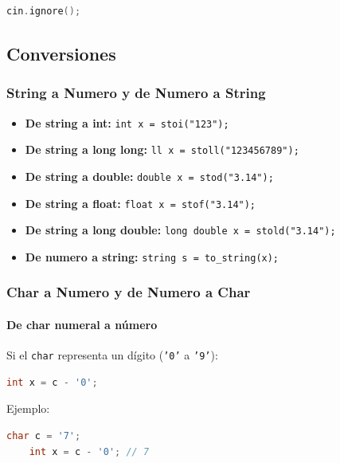 \begin{lstlisting}[language=C++]
	cin.ignore();
\end{lstlisting}



\subsection{Conversiones }

\subsubsection{String a Numero y de Numero a String }

\begin{itemize}
	\item \textbf{De string a int:}
	\texttt{int x = stoi("123");}

	\item \textbf{De string a long long:}
	\texttt{ll x = stoll("123456789");}

	\item \textbf{De string a double:}
	\texttt{double x = stod("3.14");}

	\item \textbf{De string a float:}
	\texttt{float x = stof("3.14");}

	\item \textbf{De string a long double:}
	\texttt{long double x = stold("3.14");}

	\item \textbf{De numero a string:}
	\texttt{string s = to\_string(x);}
\end{itemize}

\subsubsection{Char a Numero y de Numero a Char}

\paragraph{De char numeral a número}
Si el \texttt{char} representa un dígito (\texttt{'0'} a \texttt{'9'}):

\begin{lstlisting}[language=C++]
	int x = c - '0';
\end{lstlisting}

Ejemplo:
\begin{lstlisting}[language=C++]
	char c = '7';
	int x = c - '0'; // 7
\end{lstlisting}

